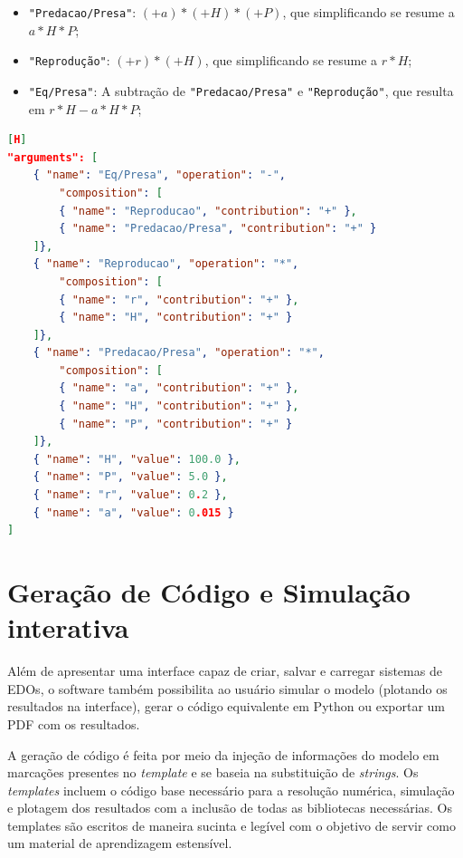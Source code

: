 \documentclass[
	12pt,				%
	openright,			%
	oneside,			%
	a4paper,			%
	main=brazil,
	english,			%
	]{ufsj-abntex2}
\begin{document}
\begin{itemize}
    \item \texttt{"Predacao/Presa"}: \((+a)*(+H)*(+P)\), que simplificando se resume a \(a*H*P\);
    \item \texttt{"Reprodução"}: \((+r)*(+H)\), que simplificando se resume a \(r*H\);
    \item \texttt{"Eq/Presa"}: A subtração de \texttt{"Predacao/Presa"} e \texttt{"Reprodução"}, que resulta em \(r*H-a*H*P\);
\end{itemize}

\begin{lstlisting}[language=json, label=ri:presa, caption=Trecho da RI que define termos e combinações usadas para definir a equação da presa.][H]
"arguments": [
    { "name": "Eq/Presa", "operation": "-",
        "composition": [
        { "name": "Reproducao", "contribution": "+" },
        { "name": "Predacao/Presa", "contribution": "+" }
    ]},
    { "name": "Reproducao", "operation": "*",
        "composition": [
        { "name": "r", "contribution": "+" },
        { "name": "H", "contribution": "+" }
    ]},
    { "name": "Predacao/Presa", "operation": "*",
        "composition": [
        { "name": "a", "contribution": "+" },
        { "name": "H", "contribution": "+" },
        { "name": "P", "contribution": "+" }
    ]},
    { "name": "H", "value": 100.0 },
    { "name": "P", "value": 5.0 },
    { "name": "r", "value": 0.2 },
    { "name": "a", "value": 0.015 }
]
\end{lstlisting}

\section{Geração de Código e Simulação interativa}

Além de apresentar uma interface capaz de criar, salvar e carregar sistemas de EDOs, o software também possibilita ao usuário simular o modelo (plotando os resultados na interface), gerar o código equivalente em Python ou exportar um PDF com os resultados.

A geração de código é feita por meio da injeção de informações do modelo em marcações presentes no \textit{template} e se baseia na substituição de \textit{strings}. Os \textit{templates} incluem o código base necessário para a resolução numérica, simulação e plotagem dos resultados com a inclusão de todas as bibliotecas necessárias. Os templates são escritos de maneira sucinta e legível com o objetivo de servir como um material de aprendizagem estensível.
\end{document}
